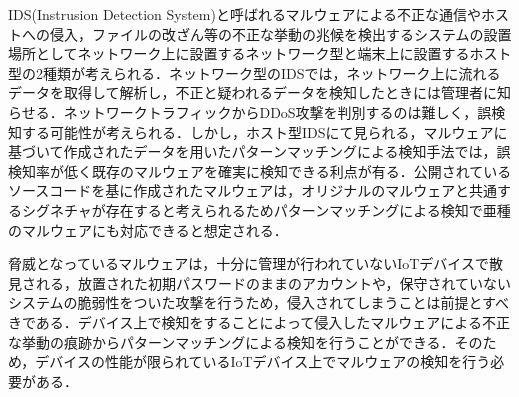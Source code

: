 IDS(Instrusion Detection System)と呼ばれるマルウェアによる不正な通信やホストへの侵入，ファイルの改ざん等の不正な挙動の兆候を検出するシステムの設置場所としてネットワーク上に設置するネットワーク型と端末上に設置するホスト型の2種類が考えられる．ネットワーク型のIDSでは，ネットワーク上に流れるデータを取得して解析し，不正と疑われるデータを検知したときには管理者に知らせる．ネットワークトラフィックからDDoS攻撃を判別するのは難しく，誤検知する可能性が考えられる．しかし，ホスト型IDSにて見られる，マルウェアに基づいて作成されたデータを用いたパターンマッチングによる検知手法では，誤検知率が低く既存のマルウェアを確実に検知できる利点が有る．公開されているソースコードを基に作成されたマルウェアは，オリジナルのマルウェアと共通するシグネチャが存在すると考えられるためパターンマッチングによる検知で亜種のマルウェアにも対応できると想定される．\par
脅威となっているマルウェアは，十分に管理が行われていないIoTデバイスで散見される，放置された初期パスワードのままのアカウントや，保守されていないシステムの脆弱性をついた攻撃を行うため，侵入されてしまうことは前提とすべきである．デバイス上で検知をすることによって侵入したマルウェアによる不正な挙動の痕跡からパターンマッチングによる検知を行うことができる．そのため，デバイスの性能が限られているIoTデバイス上でマルウェアの検知を行う必要がある．

